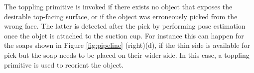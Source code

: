 \rahul{
}
The toppling primitive is invoked if there exists no object that exposes the desirable top-facing surface, or if the object was erroneously picked from the wrong face. The latter is detected after the pick by performing pose estimation once the objet is attached to the suction cup. For instance this can happen for the soaps shown in Figure \ref{fig:pipeline} (right)(d), if the thin side is available for pick but the soap needs to be placed on their wider side. In this case, a toppling primitive is used to reorient the object.
